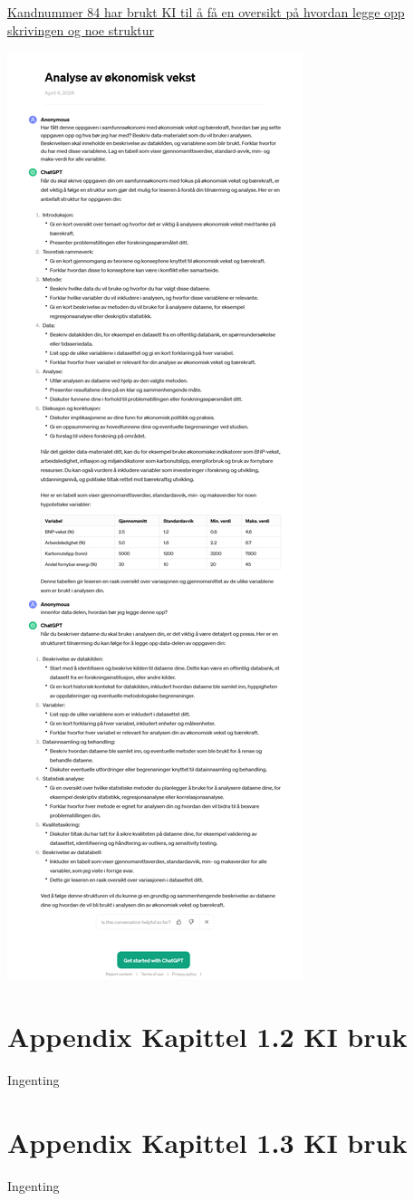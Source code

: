 \documentclass[
  12pt,
  a4paper,
  DIV=11,
  numbers=noendperiod]{scrartcl}
\begin{document}
\href{https://chat.openai.com/share/487619f4-de3a-4c08-8932-4317faacd357}{Kandnummer
84 har brukt KI til å få en oversikt på hvordan legge opp skrivingen og
noe struktur}

\includegraphics{dokumentobjekter/figurer/chatgpt_bruk.png}

\section {Appendix Kapittel 1.2 KI bruk}

Ingenting

\label{appendix:appendixkart}

\section {Appendix Kapittel 1.3 KI bruk}

Ingenting
\end{document}
